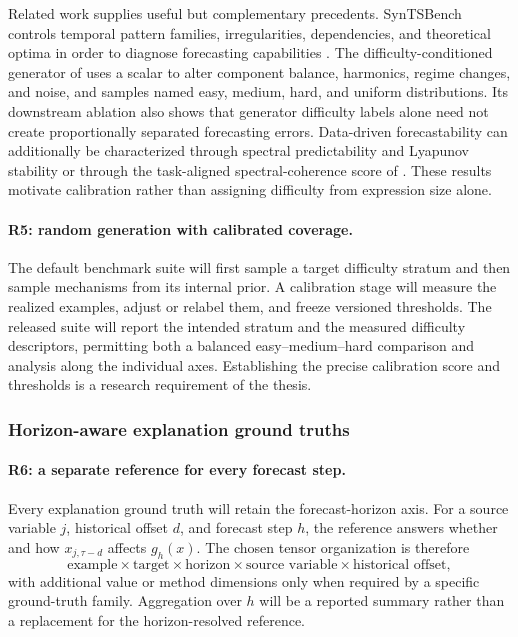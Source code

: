 Related work supplies useful but complementary precedents. SynTSBench controls
temporal pattern families, irregularities, dependencies, and theoretical
optima in order to diagnose forecasting capabilities
\citep{tan2025syntsbench}. The difficulty-conditioned generator of
\citet{cazaux2026synthetic} uses a scalar to alter component balance,
harmonics, regime changes, and noise, and samples named easy, medium, hard, and
uniform distributions. Its downstream ablation also shows that generator
difficulty labels alone need not create proportionally separated forecasting
errors. Data-driven forecastability can additionally be characterized through
spectral predictability and Lyapunov stability \citep{wang2025forecastability}
or through the task-aligned spectral-coherence score of
\citet{feng2025predictability}. These results motivate calibration rather than
assigning difficulty from expression size alone.

\paragraph{R5: random generation with calibrated coverage.}
The default benchmark suite will first sample a target difficulty stratum and
then sample mechanisms from its internal prior. A calibration stage will
measure the realized examples, adjust or relabel them, and freeze versioned
thresholds. The released suite will report the intended stratum and the
measured difficulty descriptors, permitting both a balanced easy--medium--hard
comparison and analysis along the individual axes. Establishing the precise
calibration score and thresholds is a research requirement of the thesis.

\subsubsection{Horizon-aware explanation ground truths}

\paragraph{R6: a separate reference for every forecast step.}
Every explanation ground truth will retain the forecast-horizon axis. For a
source variable $j$, historical offset $d$, and forecast step $h$, the
reference answers whether and how $x_{j,\tau-d}$ affects $g_h(x)$. The chosen
tensor organization is therefore
\[
\boxed{
\text{example}\times
\text{target}\times
\text{horizon}\times
\text{source variable}\times
\text{historical offset},
}
\]
with additional value or method dimensions only when required by a specific
ground-truth family. Aggregation over $h$ will be a reported summary rather
than a replacement for the horizon-resolved reference.

